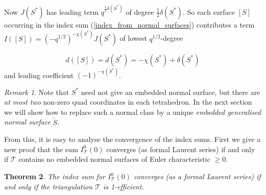 \documentclass[12pt,reqno]{amsart}  %
\newtheorem{thm}{Theorem}[section]
\theoremstyle{definition}
\theoremstyle{remark}
\newtheorem{rmk}[thm]{Remark}
\def\be{  \begin{equation} }
\def\ee{  \end{equation} }
\newcommand{\T}{\mathcal{T}}
\begin{document}
Now $J(S^*)$ has leading term $q^{\frac{1}{2} \delta(S^*)}$ of degree 
$\frac{1}{2} \delta(S^*)$. So each surface $[S]$ occurring in the index 
sum (\ref{index_from_normal_surfaces}) contributes a term 
$I([S]) = (-q^{1/2})^{-\chi(S^*)}  J(S^*)$ of lowest $q^{1/2}$-degree 

\be
d([S])=d(S^*) =-\chi(S^*) + \delta(S^*)
\label{index_deg_surface}
\ee
and leading coefficient $(-1)^{-\chi(S^*)}$.

\begin{rmk}
Note that $S^*$ need not give an embedded normal surface, but there are 
{\em at most two} non-zero quad coordinates in each tetrahedron. In the 
next section we will show how to replace such a normal class by a unique 
{\em embedded generalised normal surface} $\tilde S$.
\end{rmk}

From this, it is easy to analyse the convergence of the index sums. First 
we give a new proof that the sum $I_\T^0(0)$ converges (as formal Laurent 
series) if and only if $\T$ contains no embedded normal surfaces of 
Euler characteristic $\ge 0$.

\begin{thm} 
\label{index0_cgce}
The index sum for $I_\T^0(0)$  converges (as a formal Laurent series) if 
and only if the triangulation $\T$ is 1-efficient.
\end{thm}
\end{document}
